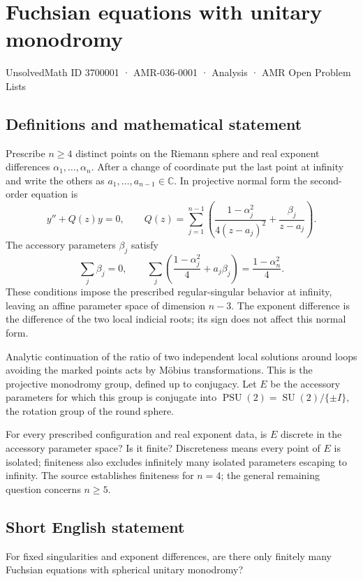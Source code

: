 \documentclass[11pt,a4paper]{article}
\begin{document}
\section*{Fuchsian equations with unitary monodromy}\label{3700001}
{\small UnsolvedMath ID 3700001 · AMR-036-0001 · Analysis · AMR Open Problem Lists}
\subsection{Definitions and mathematical statement}
Prescribe $n\geq4$ distinct points on the Riemann sphere and real
exponent differences $\alpha_1,\ldots,\alpha_n$. After a change of
coordinate put the last point at infinity and write the others
as $a_1,\ldots,a_{n-1}\in\mathbb C$. In projective normal form the
second-order equation is
\[
 y''+Q(z)y=0,\qquad
 Q(z)=\sum_{j=1}^{n-1}
       \left(\frac{1-\alpha_j^2}{4(z-a_j)^2}
                         +\frac{\beta_j}{z-a_j}\right).
\]
The accessory parameters $\beta_j$ satisfy
\[
 \sum_j\beta_j=0,\qquad
 \sum_j\left(\frac{1-\alpha_j^2}{4}+a_j\beta_j\right)
                         =\frac{1-\alpha_n^2}{4}.
\]
These conditions impose the prescribed regular-singular behavior
at infinity, leaving an affine parameter space of dimension $n-3$.
The exponent difference is the difference of the two local
indicial roots; its sign does not affect this normal form.

Analytic continuation of the ratio of two independent local
solutions around loops avoiding the marked points acts by
Möbius transformations. This is the projective monodromy group,
defined up to conjugacy. Let $E$ be the accessory parameters
for which this group is conjugate into
$\operatorname{PSU}(2)=\operatorname{SU}(2)/\{\pm I\}$, the
rotation group of the round sphere.

For every prescribed configuration and real exponent data, is
$E$ discrete in the accessory parameter space? Is it finite?
Discreteness means every point of $E$ is isolated; finiteness
also excludes infinitely many isolated parameters escaping to
infinity. The source establishes finiteness for $n=4$; the
general remaining question concerns $n\geq5$.
\subsection{Short English statement}
For fixed singularities and exponent differences, are there only finitely many Fuchsian equations with spherical unitary monodromy?
\end{document}
